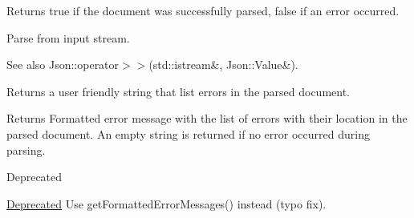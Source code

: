 \begin{DoxyReturn}{Returns}
{\ttfamily true} if the document was successfully parsed, {\ttfamily false} if an error occurred.
\end{DoxyReturn}
Parse from input stream. \begin{DoxySeeAlso}{See also}
Json\+::operator$>$$>$(std\+::istream\&, Json\+::\+Value\&).
\end{DoxySeeAlso}
Returns a user friendly string that list errors in the parsed document. \begin{DoxyReturn}{Returns}
Formatted error message with the list of errors with their location in the parsed document. An empty string is returned if no error occurred during parsing. 
\end{DoxyReturn}
\begin{DoxyRefDesc}{Deprecated}
\item[\hyperlink{deprecated__deprecated000006}{Deprecated}]Use get\+Formatted\+Error\+Messages() instead (typo fix). \end{DoxyRefDesc}


